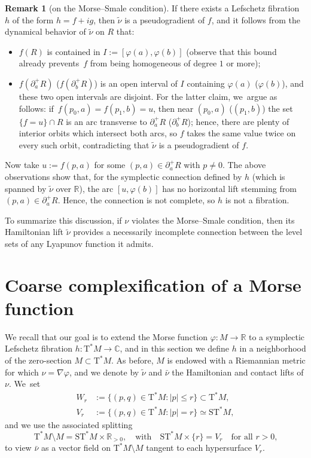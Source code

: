 \documentclass[JEP,XML,SOM,Unicode]{cedram}
\newcommand{\C}{{\mathbb C}}
\newcommand{\R}{{\mathbb R}}
\newcommand{\sT}{\mathrm{T}^\ast}
\newcommand{\sST}{\mathrm{ST}^\ast}
\newcommand{\hnu}{\tilde\nu}
\newcommand{\cnu}{\bar\nu}
\newcommand{\de}{\mathrel{:=}}
\newcommand{\with}{\mathrel{:}}
\let\del\partial
\let\on\colon
\theoremstyle{plain}
\theoremstyle{definition}
\newtheorem{remark}[theorem]{Remark}
\begin{document}
\begin{remark}[on the Morse--Smale condition]
If there exists a Lefschetz fibration $h$ of the form $h = f+ig$, then $\hnu$ is
a pseudogradient of $f$, and it follows from the dynamical behavior of $\hnu$
on $R$ that:
\begin{itemize}
\item
$f(R)$ is contained in $I \de [\varphi(a),\varphi(b)]$ (observe that this bound
already prevents~$f$ from being homogeneous of degree $1$ or more);
\item
$f(\del_a^+R)$ (\resp $f(\del_b^+R)$) is an open interval of $I$ containing
$\varphi(a)$ (\resp $\varphi(b)$), and these two open intervals are disjoint.
For the latter claim, we~argue as follows: if~$f(p_0,a) = f(p_1,b) = u$, then near $(p_0,a)$ (\resp $(p_1,b)$) the set $\{f=u\} \cap R$ is an arc transverse
to $\del_a^+R$ (\resp $\del_b^+R$); hence, there are plenty of interior orbits
which intersect both arcs, so $f$ takes the same value twice on every such
orbit, contradicting that $\hnu$ is a pseudogradient of $f$.
\end{itemize}
Now take $u \de f(p,a)$ for some $(p,a) \in \del_a^+R$ with $p \ne 0$. The above
observations show that, for the symplectic connection defined by $h$ (which is
spanned by $\hnu$ over $\R$), the arc $[u,\varphi(b)]$ has no horizontal lift
stemming from $(p,a) \in \del_a^+R$. Hence, the connection is not complete, so
$h$ is not a fibration.

To summarize this discussion, if $\nu$ violates the Morse--Smale condition, then
its Hamiltonian lift $\hnu$ provides a necessarily incomplete connection between
the level sets of any Lyapunov function it admits.
\end{remark}

\section{Coarse complexification of a Morse function} \label{s:coarse}

We recall that our goal is to extend the Morse function $\varphi \on M \to \R$
to a symplectic Lefschetz fibration $h \on \sT M \to \C$, and in this section we
define $h$ in a neighborhood of the zero-section $M \subset \sT M$. As before,
$M$ is endowed with a Riemannian metric for which $\nu = \nabla\varphi$, and we
denote by $\hnu$ and $\cnu$ the Hamiltonian and contact lifts of $\nu$. We~set
\begin{align*}
	W_r &\de \{(p,q) \in \sT M \with |p| \le r\} \subset \sT M, \\
	V_r &\de \{(p,q) \in \sT M \with |p| = r\} \simeq \sST M,
\end{align*}
and we use the associated splitting
\[
\sT M \setminus M = \sST M \times \R_{>0}, \quad \text{with} \quad
	\sST M \times \{r\} = V_r \quad \text{for all $r>0$,}
\]
to view $\cnu$ as a vector field on $\sT M \setminus M$ tangent to each hypersurface
$V_r$.
\end{document}
